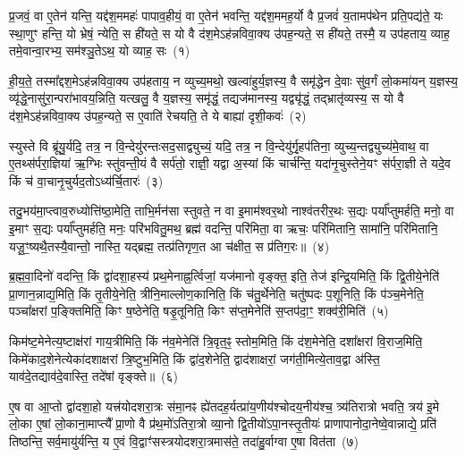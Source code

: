 \setcounter{anuvakam}{0}
प्र॒जवं॒ वा ए॒तेन॑ यन्ति॒ यद्द॑श॒ममहः॑ पापाव॒हीयं॒ वा ए॒तेन॑ भवन्ति॒ यद्द॑श॒ममह॒र्यो वै प्र॒जवं॑ य॒तामप॑थेन प्रति॒पद्य॑ते॒ यः स्था॒णुꣳ हन्ति॒ यो भ्रेषं॒ न्येति॒ स ही॑यते॒ स यो वै द॑श॒मे\-ऽह॑न्नविवा॒क्य उ॑पह॒न्यते॒ स ही॑यते॒ तस्मै॒ य उप॑हताय॒ व्याह॒ तमे॒वान्वा॒रभ्य॒ सम॑श्ञु॒ते\-ऽथ॒ यो व्याह॒ सः~(१)

ही॒य॒ते॒ तस्मा᳚द्दश॒मे\-ऽह॑न्नविवा॒क्य उप॑हताय॒ न व्युच्य॒मथो॒ खल्वा॑हुर्य॒ज्ञस्य॒ वै समृ॑द्धेन दे॒वाः सु॑व॒र्गं लो॒कमा॑यन् य॒ज्ञस्य॒ व्यृ॑द्धे॒नासु॑रा॒न्परा॑भावय॒न्निति॒ यत्खलु॒ वै य॒ज्ञस्य॒ समृ॑द्धं॒ तद्यज॑मानस्य॒ यद्व्यृ॑द्धं॒ तद्भ्रातृ॑व्यस्य॒ स यो वै द॑श॒मे\-ऽह॑न्नविवा॒क्य उ॑पह॒न्यते॒ स ए॒वाति॑ रेचयति॒ ते ये बाह्या॑ दृशी॒कवः॑~(२)

स्युस्ते वि ब्रू॑यु॒र्यदि॒ तत्र॒ न वि॒न्देयु॑रन्तःसद॒साद्व्युच्यं॒ यदि॒ तत्र॒ न वि॒न्देयु॑र्गृ॒हप॑तिना॒ व्युच्य॒न्तद्व्युच्य॑मे॒वाथ॒ वा ए॒तथ्स॑र्परा॒ज्ञिया॑ ऋ॒ग्भिः स्तु॑वन्ती॒यं वै सर्प॑तो॒ राज्ञी॒ यद्वा अ॒स्यां किं चार्च॑न्ति॒ यदा॑नृ॒चुस्तेने॒यꣳ स॑र्परा॒ज्ञी ते यदे॒व किं च॑ वा॒चानृ॒चुर्यद॒तो\-ऽध्य॑र्चि॒तारः॑~(३)

तदु॒भय॑मा॒प्त्वाव॒रुध्योत्ति॑ष्ठा॒मेति॒ ताभि॒र्मन॑सा स्तुवते॒ न वा इ॒माम॑श्वर॒थो नाश्व॑तरीर॒थः स॒द्यः पर्या᳚प्तुमर्\mbox{}हति॒ मनो॒ वा इ॒माꣳ स॒द्यः पर्या᳚प्तुमर्\mbox{}हति॒ मनः॒ परि॑भवितु॒मथ॒ ब्रह्म॑ वदन्ति॒ परि॑मिता॒ वा ऋचः॒ परि॑मितानि॒ सामा॑नि॒ परि॑मितानि॒ यजू॒ꣳ॒ष्यथै॒तस्यै॒वान्तो॒ नास्ति॒ यद्ब्रह्म॒ तत्प्र॑तिगृण॒त आ च॑क्षीत॒ स प्र॑तिग॒रः॥~(४)

{\anuvakamend[{व्याह॒ स दृ॑शी॒कवो᳚\-ऽर्चि॒तारः॒ स एक॑ञ्च}]}%

ब्र॒ह्म॒वा॒दिनो॑ वदन्ति॒ किं द्वा॑दशा॒हस्य॑ प्रथ॒मेनाह्न॒र्त्विजां॒ यज॑मानो वृङ्क्त॒ इति॒ तेज॑ इन्द्रि॒यमिति॒ किं द्वि॒तीये॒नेति॑ प्रा॒णान॒न्नाद्य॒मिति॒ किं तृ॒तीये॒नेति॒ त्रीनि॒माल्लोण॒कानिति॒ किं च॑तु॒र्थेनेति॒ चतु॑ष्पदः प॒शूनिति॒ किं प॑ञ्च॒मेनेति॒ पञ्चा᳚क्षरां प॒ङ्क्तिमिति॒ किꣳ ष॒ष्ठेनेति॒ षडृ॒तूनिति॒ किꣳ स॑प्त॒मेनेति॑ स॒प्तप॑दा॒ꣳ॒ शक्व॑री॒मिति॑~(५)

किम॑ष्ट॒मेनेत्य॒ष्टाक्ष॑रां गाय॒त्रीमिति॒ किं न॑व॒मेनेति॑ त्रि॒वृत॒ꣴ॒ स्तोम॒मिति॒ किं द॑श॒मेनेति॒ दशा᳚क्षरां वि॒राज॒मिति॒ किमे॑काद॒शेनेत्येका॑\-दशाक्षरां त्रि॒ष्टुभ॒मिति॒ किं द्वा॑द॒शेनेति॒ द्वाद॑शाक्षरां॒ जग॑ती॒मित्ये॒ताव॒द्वा अ॑स्ति॒ याव॑दे॒तद्याव॑दे॒वास्ति॒ तदे॑षां वृङ्क्ते॥~(६)

{\anuvakamend[{शक्व॑री॒मित्येक॑चत्वारिꣳशच्च}]}%

ए॒ष वा आ॒प्तो द्वा॑दशा॒हो यत्त्र॑योदशरा॒त्रः स॑मा॒नꣴ ह्ये॑तदह॒र्यत्प्रा॑य॒णीय॑श्चोदय॒नीय॑श्च॒ त्र्य॑तिरात्रो भवति॒ त्रय॑ इ॒मे लो॒का ए॒षां लो॒काना॒माप्त्यै᳚ प्रा॒णो वै प्र॑थ॒मो॑\-ऽतिरा॒त्रो व्या॒नो द्वि॒तीयो॑\-ऽपा॒नस्तृ॒तीयः॑ प्राणापानोदा॒नेष्वे॒वान्नाद्ये॒ प्रति॑ तिष्ठन्ति॒ सर्व॒मायु॑र्यन्ति॒ य ए॒वं वि॒द्वाꣳ॑सस्त्रयोदशरा॒त्रमास॑ते॒ तदा॑हु॒र्वाग्वा ए॒षा वित॑ता~(७)

